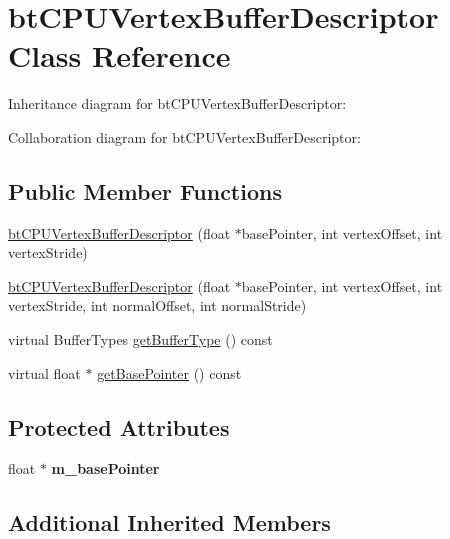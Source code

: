 \hypertarget{classbt_c_p_u_vertex_buffer_descriptor}{\section{bt\+C\+P\+U\+Vertex\+Buffer\+Descriptor Class Reference}
\label{classbt_c_p_u_vertex_buffer_descriptor}
}


Inheritance diagram for bt\+C\+P\+U\+Vertex\+Buffer\+Descriptor\+:


Collaboration diagram for bt\+C\+P\+U\+Vertex\+Buffer\+Descriptor\+:
\subsection*{Public Member Functions}
\begin{DoxyCompactItemize}
\item 
\hyperlink{classbt_c_p_u_vertex_buffer_descriptor_a297805188e446adfe37fbe68a9474d66}{bt\+C\+P\+U\+Vertex\+Buffer\+Descriptor} (float $\ast$base\+Pointer, int vertex\+Offset, int vertex\+Stride)
\item 
\hyperlink{classbt_c_p_u_vertex_buffer_descriptor_ac535162f5921eec33b7f179574d512d1}{bt\+C\+P\+U\+Vertex\+Buffer\+Descriptor} (float $\ast$base\+Pointer, int vertex\+Offset, int vertex\+Stride, int normal\+Offset, int normal\+Stride)
\item 
virtual Buffer\+Types \hyperlink{classbt_c_p_u_vertex_buffer_descriptor_a7643d3ea651f3ec59fdcef26ec55f141}{get\+Buffer\+Type} () const 
\item 
virtual float $\ast$ \hyperlink{classbt_c_p_u_vertex_buffer_descriptor_aa9b6add58c2d04ce29d5761fa0f65c43}{get\+Base\+Pointer} () const 
\end{DoxyCompactItemize}
\subsection*{Protected Attributes}
\begin{DoxyCompactItemize}
\item 
\hypertarget{classbt_c_p_u_vertex_buffer_descriptor_a6869b86f51729f404f498c747b3305f5}{float $\ast$ {\bfseries m\+\_\+base\+Pointer}}\label{classbt_c_p_u_vertex_buffer_descriptor_a6869b86f51729f404f498c747b3305f5}

\end{DoxyCompactItemize}
\subsection*{Additional Inherited Members}


